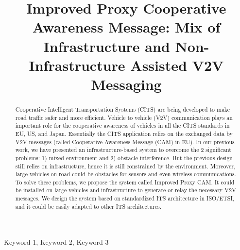 \documentclass[conference,twocolumn]{IEEEtran}
\begin{document}
\title{Improved Proxy Cooperative Awareness Message: Mix of Infrastructure and Non-Infrastructure Assisted V2V Messaging}
\author{
}

\maketitle

\begin{abstract}
Cooperative Intelligent Transportation Systems
(CITS) are being developed to make road traffic safer and more efficient.
Vehicle to vehicle (V2V) communication plays an important role for the cooperative
awareness of vehicles in all the CITS standards in EU, US, and Japan.
Essentially the CITS application relies on the exchanged data by V2V messages (called Cooperative Awareness Message (CAM) in EU).
In our previous work, we have presented an infrastructure-based system to overcome the 2 significant problems:
1) mixed environment and 2) obstacle interference.
But the previous design still relies on infrastructure, hence it is still constrained by the environment.
Moreover, large vehicles on road could be obstacles for sensors and even wireless communications.
To solve these problems, we propose the system called Improved Proxy CAM.
It could be installed on large vehicles and infrastructure to generate or relay the necessary V2V messages.
We design the system based on standardized ITS architecture in ISO/ETSI, and it could be easily adapted to other ITS architectures.
\end{abstract}

\begin{IEEEkeywords}
 Keyword 1, Keyword 2, Keyword 3
\end{IEEEkeywords}








\end{document}
